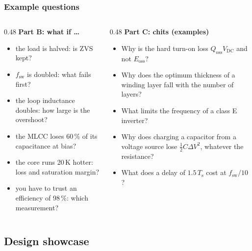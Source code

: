 \begin{frame}
	\frametitle{Example questions}
	\begin{columns}[T]
		\begin{column}{0.48\textwidth}
			\small
			\textbf{Part B: what if \ldots}
			\begin{itemize}
				\item the load is halved: is ZVS kept?
				\item $f_\mathrm{sw}$ is doubled: what fails first?
				\item the loop inductance doubles: how large is the overshoot?
				\item the MLCC loses 60\,\% of its capacitance at bias?
				\item the core runs 20\,K hotter: loss and saturation margin?
				\item you have to trust an efficiency of 98\,\%: which measurement?
			\end{itemize}
		\end{column}
		\begin{column}{0.48\textwidth}
			\small
			\textbf{Part C: chits (examples)}
			\begin{itemize}
				\item Why is the hard turn-on loss $Q_\mathrm{oss}V_\mathrm{DC}$ and not $E_\mathrm{oss}$?
				\item Why does the optimum thickness of a winding layer fall with the number of layers?
				\item What limits the frequency of a class E inverter?
				\item Why does charging a capacitor from a voltage source lose $\frac12C\Delta V^2$, whatever the resistance?
				\item What does a delay of $1.5\,T_\mathrm{s}$ cost at $f_\mathrm{sw}/10$?
			\end{itemize}
		\end{column}
	\end{columns}
\end{frame}

\subsection{Design showcase}

